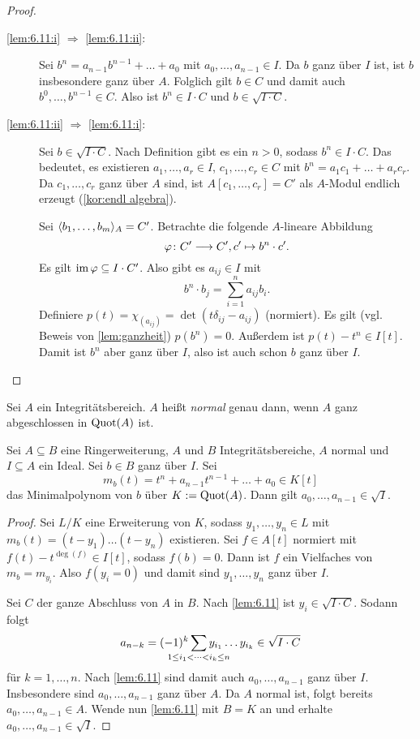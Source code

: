 \documentclass[12pt,a4paper]{scrartcl}
\theoremstyle{cplain}
\theoremstyle{cdef}
\begin{document}

\begin{proof}
	\leavevmode
	\begin{description}
		\item[\ref{lem:6.11:i} $\Rightarrow$ \ref{lem:6.11:ii}:] Sei $b^n = a_{n-1}b^{n-1}+\dots+a_0$ mit $a_0,\dots, a_{n-1}\in I$. Da $b$ ganz über $I$ ist, ist $b$ insbesondere ganz über $A$. Folglich gilt $b\in C$ und damit auch $b^0,\dots, b^{n-1}\in C$. Also ist $b^n\in I\cdot C$ und $b\in\sqrt{I\cdot C}$.
		\item[\ref{lem:6.11:ii} $\Rightarrow$ \ref{lem:6.11:i}:] Sei $b\in\sqrt{I\cdot C}$. Nach Definition gibt es ein $n>0$, sodass $b^n\in I\cdot C$. Das bedeutet, es existieren $a_1,\dots, a_r\in I$, $c_1,\dots, c_r\in C$ mit $b^n = a_1c_1+\dots+a_rc_r$. Da $c_1,\dots, c_r$ ganz über $A$ sind, ist $A[c_1,\dots, c_r] = C'$ als $A$-Modul endlich erzeugt (\cref{kor:endl algebra}).
		
		Sei $\langle b_1,\dots, b_m\rangle_A = C'$. Betrachte die folgende $A$-lineare Abbildung
		\[\varphi\colon C'\longrightarrow C', c'\mapsto b^n\cdot c'.\]
		Es gilt $\operatorname{im}\varphi\subseteq I\cdot C'$. Also gibt es $a_{ij}\in I$ mit
		\[b^n\cdot b_j = \sum_{i = 1}^{n}a_{ij}b_i .\]
		Definiere $p(t) = \chi_{(a_{ij})}= \det(t\delta_{ij}-a_{ij})$ (normiert). Es gilt (vgl. Beweis von \cref{lem:ganzheit}) $p(b^n) = 0$. Außerdem ist $p(t) -t^n \in I[t]$. Damit ist $b^n$ aber ganz über $I$, also ist auch schon $b$ ganz über $I$.
		\qedhere
	\end{description}
\end{proof}

\begin{defi}
	Sei $A$ ein Integritätsbereich. $A$ heißt \emph{normal} genau dann, wenn $A$ ganz abgeschlossen in $\operatorname{Quot}(A)$ ist.
\end{defi}
\begin{lem} \label{lem:6.13}
	Sei $A\subseteq B$ eine Ringerweiterung, $A$ und $B$ Integritätsbereiche, $A$ normal und $I\subseteq A$ ein Ideal. Sei $b\in B$ ganz über $I$. Sei
	\[m_b(t) = t^n+a_{n-1}t^{n-1}+\dots +a_0\in K[t]\]
	das Minimalpolynom von $b$ über $K := \operatorname{Quot}(A)$. Dann gilt $a_0,\dots, a_{n-1}\in\sqrt{I}$.
\end{lem}

\begin{proof}
	Sei $L/K$ eine Erweiterung von $K$, sodass $y_1,\dots, y_n\in L$ mit $m_b(t) = (t-y_1)\dots(t-y_n)$ existieren. Sei $f\in A[t]$ normiert mit $f(t) -t^{\deg(f)}\in I[t]$, sodass $f(b) = 0$. Dann ist $f$ ein Vielfaches von $m_b = m_{y_i}$. Also $f(y_i= 0)$ und damit sind $y_1,\dots, y_n$ ganz über $I$.
	
	Sei $C$ der ganze Abschluss von $A$ in $B$. Nach \cref{lem:6.11} ist $y_i\in\sqrt{I\cdot C}$.
	Sodann folgt \[a_{n-k} = (-1)^k\sum_{\mathclap{1\le i_1<\dots <i_k\le n}}y_{i_1}\dots y_{i_k}\in \sqrt{I\cdot C}\] für $k = 1,\dots, n$.
	Nach \cref{lem:6.11} sind damit auch $a_0,\dots, a_{n-1}$ ganz über $I$. Insbesondere sind $a_0,\dots, a_{n-1}$ ganz über $A$. Da $A$ normal ist, folgt bereits $a_0,\dots, a_{n-1}\in A$. Wende nun \cref{lem:6.11} mit $B = K$ an und erhalte $a_0,\dots, a_{n-1}\in \sqrt{I}$.
\end{proof}
\end{document}
